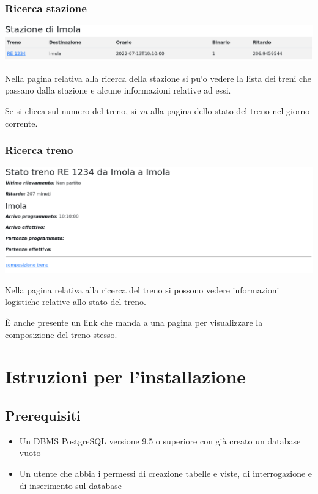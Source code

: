 \documentclass[a4paper,12pt]{report}
\begin{document}
	\subsection{Ricerca stazione}
	\includegraphics[width=\linewidth]{res/screenshots/stazione.png}
	\par Nella pagina relativa alla ricerca della stazione si pu`o vedere la lista dei treni che passano dalla stazione e alcune informazioni relative ad essi.
	\par Se si clicca sul numero del treno, si va alla pagina dello stato del treno nel giorno corrente.
	\subsection{Ricerca treno}
	\includegraphics[width=\linewidth]{res/screenshots/stato_treno.png}
	\par Nella pagina relativa alla ricerca del treno si possono vedere informazioni logistiche relative allo stato del treno.
	\par \`E anche presente un link che manda a una pagina per visualizzare la composizione del treno stesso.
	\appendix
	\chapter{Istruzioni per l'installazione}
	\section{Prerequisiti}
	\begin{itemize}
		\item Un DBMS PostgreSQL versione 9.5 o superiore con già creato un database vuoto
		\item Un utente che abbia i permessi di creazione tabelle e viste, di interrogazione e di inserimento sul database
	\end{itemize}
\end{document}
